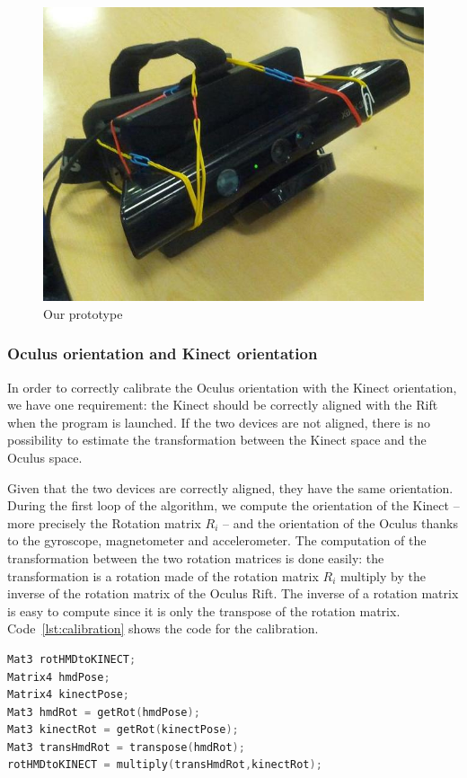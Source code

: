 \documentclass[12pt]{article}
\begin{document}
\begin{figure}[!h]
  \centering
  \includegraphics[scale=0.3]{Prototype.jpg}
  \caption{\label{fig:prototype} Our prototype}
\end{figure}

\subsubsection{Oculus orientation and Kinect orientation}
In order to correctly calibrate the Oculus orientation with the Kinect orientation, we have one requirement: the Kinect should be correctly aligned with the Rift when the program is launched. If the two devices are not aligned, there is no possibility to estimate the transformation between the Kinect space and the Oculus space.

Given that the two devices are correctly aligned, they have the same orientation. During the first loop of the algorithm, we compute the orientation of the Kinect -- more precisely the Rotation matrix $R_i$ -- and the orientation of the Oculus thanks to the gyroscope, magnetometer and accelerometer. The computation of the transformation between the two rotation matrices is done easily: the transformation is a rotation made of the rotation matrix $R_i$ multiply by the inverse of the rotation matrix of the Oculus Rift. The inverse of a rotation matrix is easy to compute since it is only the transpose of the rotation matrix. Code~\ref{lst:calibration} shows the code for the calibration.

\begin{lstlisting}[language=C++, caption={C++ code for finding the transformation between the Kinect and the Rift}, label={lst:calibration}]
Mat3 rotHMDtoKINECT;
Matrix4 hmdPose;
Matrix4 kinectPose;
Mat3 hmdRot = getRot(hmdPose);
Mat3 kinectRot = getRot(kinectPose);
Mat3 transHmdRot = transpose(hmdRot);
rotHMDtoKINECT = multiply(transHmdRot,kinectRot);
\end{lstlisting}
\end{document}
